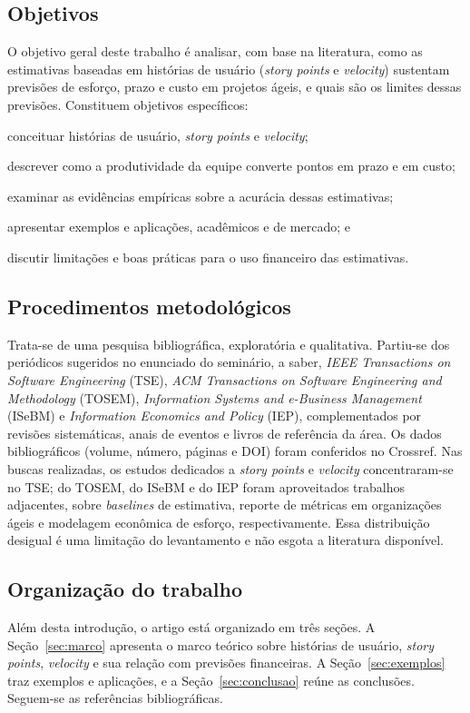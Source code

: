 \subsection{Objetivos}

O objetivo geral deste trabalho é analisar, com base na literatura, como as
estimativas baseadas em histórias de usuário (\textit{story points} e
\textit{velocity}) sustentam previsões de esforço, prazo e custo em projetos
ágeis, e quais são os limites dessas previsões. Constituem objetivos
específicos:
%
\begin{alineas}
  \item conceituar histórias de usuário, \textit{story points} e
        \textit{velocity};
  \item descrever como a produtividade da equipe converte pontos em prazo e em
        custo;
  \item examinar as evidências empíricas sobre a acurácia dessas estimativas;
  \item apresentar exemplos e aplicações, acadêmicos e de mercado; e
  \item discutir limitações e boas práticas para o uso financeiro das
        estimativas.
\end{alineas}

\subsection{Procedimentos metodológicos}

Trata-se de uma pesquisa bibliográfica, exploratória e qualitativa. Partiu-se
dos periódicos sugeridos no enunciado do seminário, a saber, \textit{IEEE
Transactions on Software Engineering} (TSE), \textit{ACM Transactions on
Software Engineering and Methodology} (TOSEM), \textit{Information Systems and
e-Business Management} (ISeBM) e \textit{Information Economics and Policy}
(IEP), complementados por revisões sistemáticas, anais de eventos e livros de
referência da área. Os dados bibliográficos (volume, número, páginas e DOI)
foram conferidos no Crossref. Nas buscas realizadas, os estudos dedicados a
\textit{story points} e \textit{velocity} concentraram-se no TSE; do TOSEM, do
ISeBM e do IEP foram aproveitados trabalhos adjacentes, sobre
\textit{baselines} de estimativa, reporte de métricas em organizações ágeis e
modelagem econômica de esforço, respectivamente. Essa distribuição desigual é
uma limitação do levantamento e não esgota a literatura disponível.

\subsection{Organização do trabalho}

Além desta introdução, o artigo está organizado em três seções. A
Seção~\ref{sec:marco} apresenta o marco teórico sobre histórias de usuário,
\textit{story points}, \textit{velocity} e sua relação com previsões
financeiras. A Seção~\ref{sec:exemplos} traz exemplos e aplicações, e a
Seção~\ref{sec:conclusao} reúne as conclusões. Seguem-se as referências
bibliográficas.

